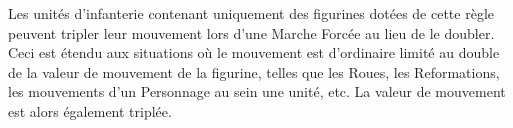 \newcommand{\volcanocannonrule}{%
Peut tirer de deux manières :
\begin{itemize}[label={-}]
\item \textbf{\artilleryweapon} de type \textbf{\flamethrower{}}.\newline
\range{15}, \Strength{} 5, \flamingattacks{}, \multiplewounds{1D3}{}.
\item \textbf{\artilleryweapon} de type \textbf{\flamethrower{}}.\newline
\range{24}, \Strength{} 1.\newline
Les unités touchées gagnent la règle \flammable{} et les \flamingattacks{} dirigées contre elles gagnent la règle \divineattacks{}. Ces effets durent jusqu'à la fin du Tour de Joueur suivant.
\end{itemize}
}

\newcommand{\titanmortarrule}{%
\textbf{\artilleryweapon} de type \textbf{\catapult{}}.\newline
\range{6-48}, \Strength{} 4 [9], [\multiplewounds{\ordnance}{}]. 
}

\newcommand{\hobgoblinboltthrowerrule}{%
\textbf{\artilleryweapon} de type \textbf{\boltthrower{}}.\newline
\range{48}, \Strength{} 6, \multiplewounds{1D3}{}, \armourpiercing{6}. 
}

\newcommand{\gunneryteamrule}{%
\textbf{\artilleryweapon} de type \textbf{\volleygun{}}.\newline
\range{24}, \Strength{} 4, \multipleshots{1D6, 2D6 ou 3D6}{}. 
}













\vspace*{1.5cm}
\startarmyspecialrules

\armyspecialruleentry{\relentless{}}

Les unités d'infanterie contenant uniquement des figurines dotées de cette règle peuvent tripler leur mouvement lors d'une Marche Forcée au lieu de le doubler. Ceci est étendu aux situations où le mouvement est d'ordinaire limité au double de la valeur de mouvement de la figurine, telles que les Roues, les Reformations, les mouvements d'un Personnage au sein une unité, etc. La valeur de mouvement est alors également triplée.

\armyspecialruleentry{\sturdy{}}


